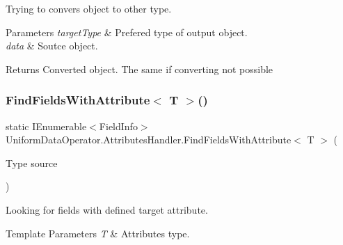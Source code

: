 Trying to convers object to other type. 


\begin{DoxyParams}{Parameters}
{\em target\+Type} & Prefered type of output object.\\
\hline
{\em data} & Soutce object.\\
\hline
\end{DoxyParams}
\begin{DoxyReturn}{Returns}
Converted object. The same if converting not possible
\end{DoxyReturn}
\mbox{\label{class_uniform_data_operator_1_1_attributes_handler_a075ceb8dabe05f15f7bd0bd4b1517c80}} 
\subsubsection{\texorpdfstring{Find\+Fields\+With\+Attribute$<$ T $>$()}{FindFieldsWithAttribute< T >()}}
{\footnotesize\ttfamily static I\+Enumerable$<$Field\+Info$>$ Uniform\+Data\+Operator.\+Attributes\+Handler.\+Find\+Fields\+With\+Attribute$<$ T $>$ (\begin{DoxyParamCaption}\item[{Type}]{source }\end{DoxyParamCaption})\hspace{0.3cm}{\ttfamily [static]}}



Looking for fields with defined target attribute. 


\begin{DoxyTemplParams}{Template Parameters}
{\em T} & Attribute\textquotesingle{}s type.\\
\hline
\end{DoxyTemplParams}

